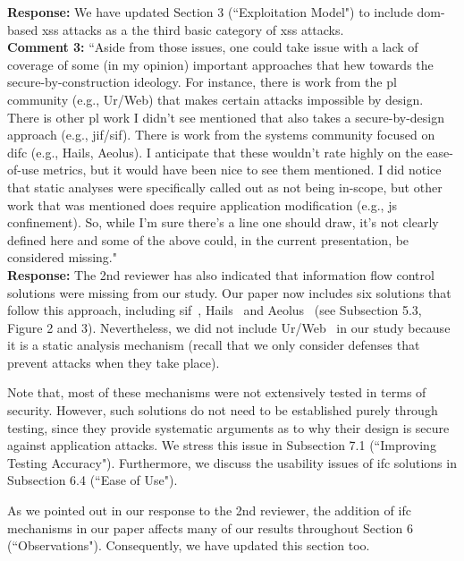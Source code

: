 \documentclass[10pt,journal,compsoc]{IEEEtran}
\begin{document}
\noindent
{\bf Response:}
We have updated Section 3 (``Exploitation Model")
to include {\sc dom}-based {\sc xss} attacks
as a the third basic category of {\sc xss}
attacks.\\

\noindent
{\bf Comment 3:} ``Aside from those issues,
one could take issue with a lack of coverage of some
(in my opinion) important approaches that hew towards the
secure-by-construction ideology.
For instance,
there is work from the {\sc pl} community (e.g., Ur/Web)
that makes certain attacks impossible by design.
There is other {\sc pl} work I didn't
see mentioned that also takes a
secure-by-design approach (e.g., {\sc jif}/{\sc sif}).
There is work from the systems
community focused on {\sc difc} (e.g., Hails, Aeolus).
I anticipate that these
wouldn't rate highly on the ease-of-use metrics,
but it would have been nice to see them mentioned.
I did notice that static analyses were specifically
called out as not being in-scope,
but other work that was mentioned does
require application modification (e.g., {\sc js} confinement).
So, while I'm sure there's a line one should draw,
it's not clearly defined here and some of the
above could, in the current presentation,
be considered missing."\\

\noindent
{\bf Response:}
The 2nd reviewer has also indicated that
information flow control solutions
were missing from our study.
Our paper now includes six solutions
that follow this approach,
including {\sc sif}~\cite{CVMA07},
Hails~\cite{GLSTMMR12}
and Aeolus~\cite{CPSPBCCSL12}
(see Subsection 5.3, Figure 2 and 3).
Nevertheless,
we did not include Ur/Web~\cite{C10b}
in our study because it is a static 
analysis mechanism
(recall that we only consider defenses
that prevent attacks when they take place).

Note that,
most of these mechanisms were not
extensively tested in terms of security.
However,
such solutions do not need to be
established purely through testing,
since they provide systematic
arguments as to why their design is
secure against application attacks.
We stress this issue in Subsection
7.1 (``Improving Testing Accuracy").
Furthermore,
we discuss the usability issues of
{\sc ifc} solutions in Subsection 6.4
(``Ease of Use").

As we pointed out in our
response to the 2nd reviewer,
the addition of {\sc ifc} mechanisms
in our paper affects many of our results
throughout Section 6 (``Observations").
Consequently,
we have updated this section too.\\



\end{document}

